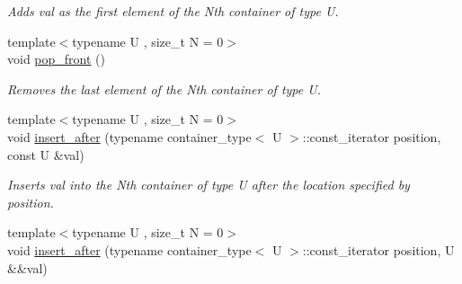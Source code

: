 \begin{DoxyCompactItemize}
\begin{DoxyCompactList}\small\item\em Adds val as the first element of the Nth container of type U. \end{DoxyCompactList}\item 
\hypertarget{classheterogeneous_1_1heteroforward__list_3_01_t_00_01_types_8_8_8_4_a47597feefe28e05ae39e1c78b590b036}{}{\footnotesize template$<$typename U , size\+\_\+t N = 0$>$ }\\void \hyperlink{classheterogeneous_1_1heteroforward__list_3_01_t_00_01_types_8_8_8_4_a47597feefe28e05ae39e1c78b590b036}{pop\+\_\+front} ()\label{classheterogeneous_1_1heteroforward__list_3_01_t_00_01_types_8_8_8_4_a47597feefe28e05ae39e1c78b590b036}

\begin{DoxyCompactList}\small\item\em Removes the last element of the Nth container of type U. \end{DoxyCompactList}\item 
\hypertarget{classheterogeneous_1_1heteroforward__list_3_01_t_00_01_types_8_8_8_4_a974c4a0fd410fa4d83a4b2135b3c1937}{}{\footnotesize template$<$typename U , size\+\_\+t N = 0$>$ }\\void \hyperlink{classheterogeneous_1_1heteroforward__list_3_01_t_00_01_types_8_8_8_4_a974c4a0fd410fa4d83a4b2135b3c1937}{insert\+\_\+after} (typename container\+\_\+type$<$ U $>$\+::const\+\_\+iterator position, const U \&val)\label{classheterogeneous_1_1heteroforward__list_3_01_t_00_01_types_8_8_8_4_a974c4a0fd410fa4d83a4b2135b3c1937}

\begin{DoxyCompactList}\small\item\em Inserts val into the Nth container of type U after the location specified by position. \end{DoxyCompactList}\item 
\hypertarget{classheterogeneous_1_1heteroforward__list_3_01_t_00_01_types_8_8_8_4_a6c62ff2de7b0ce580ff1a0818fb718c0}{}{\footnotesize template$<$typename U , size\+\_\+t N = 0$>$ }\\void \hyperlink{classheterogeneous_1_1heteroforward__list_3_01_t_00_01_types_8_8_8_4_a6c62ff2de7b0ce580ff1a0818fb718c0}{insert\+\_\+after} (typename container\+\_\+type$<$ U $>$\+::const\+\_\+iterator position, U \&\&val)\label{classheterogeneous_1_1heteroforward__list_3_01_t_00_01_types_8_8_8_4_a6c62ff2de7b0ce580ff1a0818fb718c0}


\end{DoxyCompactItemize}
